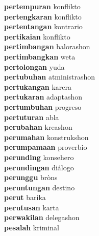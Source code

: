 \textbf{pertempuran } konflikto \\
\textbf{pertengkaran } konflikto \\
\textbf{pertentangan } kontrario \\
\textbf{pertikaian } konflikto \\
\textbf{pertimbangan } balorashon \\
\textbf{pertimbangkan } weta \\
\textbf{pertolongan } yuda \\
\textbf{pertubuhan } atministrashon \\
\textbf{pertukangan } karera \\
\textbf{pertukaran } adaptashon \\
\textbf{pertumbuhan } progreso \\
\textbf{pertuturan } abla \\
\textbf{perubahan } kreashon \\
\textbf{perumahan } konstrukshon \\
\textbf{perumpamaan } proverbio \\
\textbf{perunding } konsehero \\
\textbf{perundingan } diálogo \\
\textbf{perunggu } bròns \\
\textbf{peruntungan } destino \\
\textbf{perut } barika \\
\textbf{perutusan } karta \\
\textbf{perwakilan } delegashon \\
\textbf{pesalah } kriminal \\
